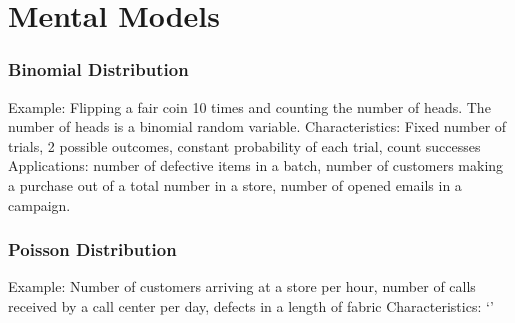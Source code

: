 \section*{Mental Models}
\subsubsection*{Binomial Distribution}
Example: Flipping a fair coin 10 times and counting the number of heads. The number of heads is a binomial random variable.
Characteristics: Fixed number of trials, 2 possible outcomes, constant probability of each trial, count successes
Applications: number of defective items in a batch, number of customers making a purchase out of a total number in a store, number of opened emails in a campaign.

\subsubsection*{Poisson Distribution}
Example: Number of customers arriving at a store per hour, number of calls received by a call center per day, defects in a length of fabric
Characteristics: `'